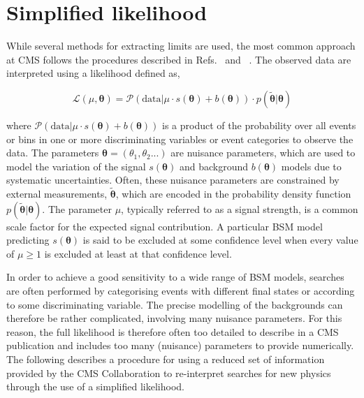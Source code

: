 \section{Simplified likelihood}
\label{sec:simplified-likelihood}

While several methods for extracting 
limits are used, the most common approach at CMS follows the procedures  
described in Refs.~\cite{Chatrchyan:2012tx} and ~\cite{CMS-NOTE-2011-005}. 
The observed data are interpreted using a likelihood defined as,

\begin{equation}
 \mathcal{L}(\mu, \boldsymbol{\theta}) = 
 \mathcal{P}(\mathrm{data}|\mu\cdot s(\boldsymbol{\theta}) + b(\boldsymbol{\theta})) \cdot p(\tilde{\boldsymbol{\theta}}|\boldsymbol{\theta})
\label{eq:generic-likelihood}
\end{equation}

where $\mathcal{P}(\mathrm{data}|\mu\cdot s(\boldsymbol{\theta}) + b(\boldsymbol{\theta}))$ is a product of the probability 
over all events or bins in one or more discriminating variables or event categories to observe the data. The parameters 
$\boldsymbol{\theta}=\left(\theta_{1},\theta_{2}...\right)$ are nuisance parameters, which are used to model the variation of the 
signal $s(\boldsymbol{\theta})$ and background $b(\boldsymbol{\theta})$ models due to systematic uncertainties. Often, these nuisance 
parameters are constrained by external measurements, $\tilde{\boldsymbol{\theta}}$, which are encoded in the 
probability density function $p(\tilde{\boldsymbol{\theta}}|\boldsymbol{\theta})$. 
The parameter $\mu$, typically referred to as a signal strength, is a common scale factor for the expected signal contribution. 
A particular BSM model predicting $s(\boldsymbol{\theta})$ is said to be excluded at some confidence level 
when every value of $\mu\ge1$ is excluded at least at that confidence level.

In order to achieve a good sensitivity to a wide range of BSM models, searches are often performed 
by categorising events with different final states or according to some discriminating variable. 
The precise modelling of the backgrounds can therefore be rather complicated, involving many 
nuisance parameters. For this reason, the full likelihood is therefore often 
too detailed to describe in a CMS publication and includes too many (nuisance) parameters to provide numerically. 
The following describes a procedure for using a reduced set of information provided by the CMS Collaboration to 
re-interpret searches for new physics through the use of a simplified likelihood. 


